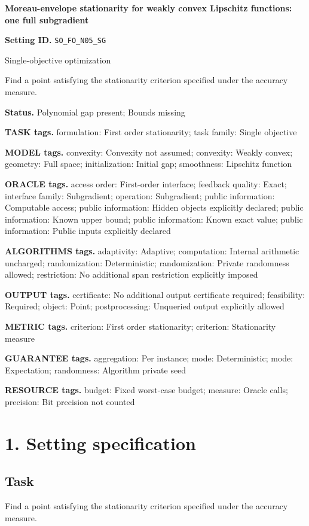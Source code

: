 \documentclass[10pt,a4paper]{article}
\begin{document}
\raggedright

{\LARGE\bfseries\sffamily\color{AtlasNavy} Moreau-envelope stationarity for weakly convex Lipschitz functions: one full subgradient\par}\vspace{5pt}
\textbf{Setting ID.} \texttt{SO\_\allowbreak{}FO\_\allowbreak{}N05\_\allowbreak{}SG}

Single-objective optimization

Find a point satisfying the stationarity criterion specified under the accuracy measure.

\textbf{Status.} Polynomial gap present; Bounds missing

\textbf{TASK tags.} formulation: First order stationarity; task family: Single objective

\textbf{MODEL tags.} convexity: Convexity not assumed; convexity: Weakly convex; geometry: Full space; initialization: Initial gap; smoothness: Lipschitz function

\textbf{ORACLE tags.} access order: First-order interface; feedback quality: Exact; interface family: Subgradient; operation: Subgradient; public information: Computable access; public information: Hidden objects explicitly declared; public information: Known upper bound; public information: Known exact value; public information: Public inputs explicitly declared

\textbf{ALGORITHMS tags.} adaptivity: Adaptive; computation: Internal arithmetic uncharged; randomization: Deterministic; randomization: Private randomness allowed; restriction: No additional span restriction explicitly imposed

\textbf{OUTPUT tags.} certificate: No additional output certificate required; feasibility: Required; object: Point; postprocessing: Unqueried output explicitly allowed

\textbf{METRIC tags.} criterion: First order stationarity; criterion: Stationarity measure

\textbf{GUARANTEE tags.} aggregation: Per instance; mode: Deterministic; mode: Expectation; randomness: Algorithm private seed

\textbf{RESOURCE tags.} budget: Fixed worst-case budget; measure: Oracle calls; precision: Bit precision not counted

\section{1. Setting specification}
\subsection{Task}
Find a point satisfying the stationarity criterion specified under the accuracy measure.
\end{document}
